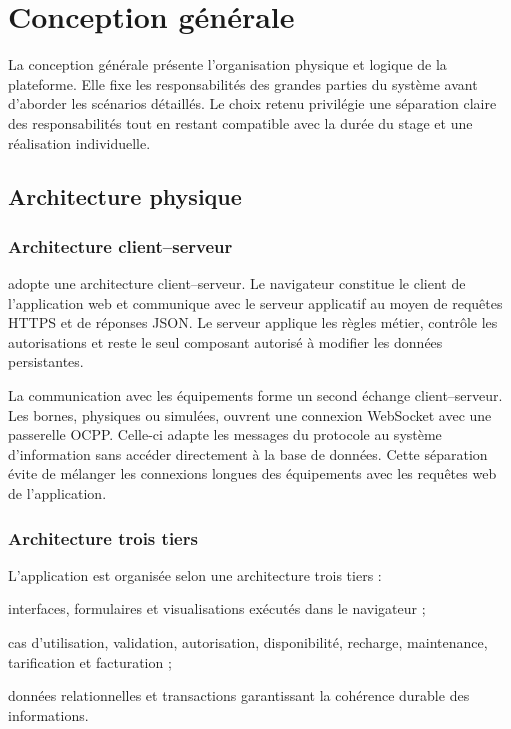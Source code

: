 \section{Conception générale}

La conception générale présente l'organisation physique et logique de la
plateforme. Elle fixe les responsabilités des grandes parties du système avant
d'aborder les scénarios détaillés. Le choix retenu privilégie une séparation
claire des responsabilités tout en restant compatible avec la durée du stage et
une réalisation individuelle.

\subsection{Architecture physique}

\subsubsection{Architecture client--serveur}

\ProjectName{} adopte une architecture client--serveur. Le navigateur constitue
le client de l'application web et communique avec le serveur applicatif au moyen
de requêtes HTTPS et de réponses JSON. Le serveur applique les règles métier,
contrôle les autorisations et reste le seul composant autorisé à modifier les
données persistantes.

La communication avec les équipements forme un second échange client--serveur.
Les bornes, physiques ou simulées, ouvrent une connexion WebSocket avec une
passerelle OCPP. Celle-ci adapte les messages du protocole au système
d'information sans accéder directement à la base de données. Cette séparation
évite de mélanger les connexions longues des équipements avec les requêtes web de
l'application.

\subsubsection{Architecture trois tiers}

L'application est organisée selon une architecture trois tiers :

\begin{description}[leftmargin=35mm,style=nextline]
  \item[Présentation] interfaces, formulaires et visualisations exécutés dans le
  navigateur ;
  \item[Application et métier] cas d'utilisation, validation, autorisation,
  disponibilité, recharge, maintenance, tarification et facturation ;
  \item[Persistance] données relationnelles et transactions garantissant la
  cohérence durable des informations.
\end{description}

